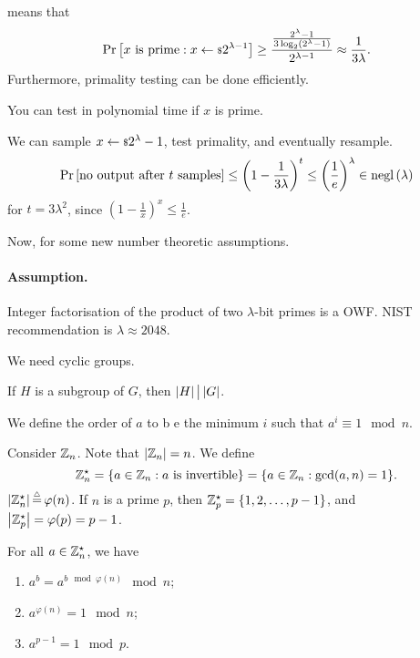  means that
\begin{equation*}
	\mathop{\mathrm{Pr}}\limits_{} \left[ {x \text{ is prime} : x \leftarrow {\scriptstyle \$} {2^{\lambda - 1}}} \right] \ge \frac{\frac{2^{\lambda} - 1}{3 \log_2(2^{\lambda} - 1)}}{2^{\lambda - 1}} \approx \frac{1}{3\lambda}.
\end{equation*}
Furthermore, primality testing can be done efficiently.

\begin{theorem}
	You can test in polynomial time if $x$ is prime.
\end{theorem}

We can sample $x \leftarrow {\scriptstyle \$} {2^{\lambda} - 1}$, test primality, and eventually resample.
\begin{equation*}
	\mathop{\mathrm{Pr}}\limits_{} \left[ {\text{no output after $t$ samples}} \right] \le \left( 1 - \frac{1}{3\lambda}\right)^{t} \le \left(\frac{1}{e} \right)^{\lambda} \in \mathrm{negl}\left({\lambda}\right)
\end{equation*}
for $t = 3 \lambda^2$, since $\left( 1 - \frac{1}{x} \right)^x \le \frac{1}{e}$.

Now, for some new number theoretic assumptions.

\paragraph{Assumption.} Integer factorisation of the product of two $\lambda$-bit primes is a \ac{OWF}.
\ac{NIST} recommendation is $\lambda \approx 2048$.

We need cyclic groups.

\begin{theorem}[Lagrange] \label{thm:lagrange}
	If $H$ is a subgroup of $G$, then $\left|{H}\right| \big| \left|{G}\right|$.
\end{theorem}

We define the order of $a$ to b e the minimum $i$ such that $a^i \equiv 1 \mod n$.

Consider $\mathbb{Z}_n$.
Note that $\left|{\mathbb{Z}_n}\right| = n$.
We define
\begin{equation*}
	\mathbb{Z}_n^{\star} = \{ a \in \mathbb{Z}_n : a \text{ is invertible}\} =
	\{ a \in \mathbb{Z}_n : \gcd(a,n) = 1 \}.
\end{equation*}
$\left|{\mathbb{Z}_n^{\star}}\right| \mathop{=}\limits^{\scriptscriptstyle \triangle} \varphi(n)$.
If $n$ is a prime $p$, then $\mathbb{Z}_p^{\star} = \{ 1, 2, \dots, p - 1\}$, and $\left|{\mathbb{Z}_p^{\star}}\right| = \varphi(p) = p-1$.

\begin{corollary}
	For all $a \in \mathbb{Z}_n^{\star}$, we have
	\begin{enumerate}
		\item $a^b = a^{b \mod \varphi(n)} \mod n$;
		\item $a^{\varphi(n)} = 1 \mod n$;
		\item $a^{p-1} = 1 \mod p$. \qedhere
	\end{enumerate}
\end{corollary}

